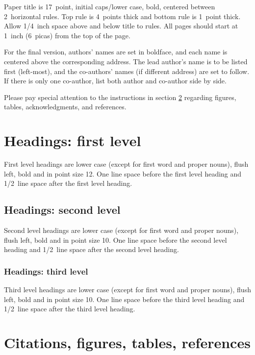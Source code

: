\documentclass{article} %
\begin{document}
Paper title is 17~point, initial caps/lower case, bold, centered between
2~horizontal rules. Top rule is 4~points thick and bottom rule is 1~point
thick. Allow 1/4~inch space above and below title to rules. All pages should
start at 1~inch (6~picas) from the top of the page.


For the final version, authors' names are
set in boldface, and each name is centered above the corresponding
address. The lead author's name is to be listed first (left-most), and
the co-authors' names (if different address) are set to follow. If
there is only one co-author, list both author and co-author side by side.

Please pay special attention to the instructions in section \ref{others}
regarding figures, tables, acknowledgments, and references.

\section{Headings: first level}
\label{headings}

First level headings are lower case (except for first word and proper nouns),
flush left, bold and in point size 12. One line space before the first level
heading and 1/2~line space after the first level heading.

\subsection{Headings: second level}

Second level headings are lower case (except for first word and proper nouns),
flush left, bold and in point size 10. One line space before the second level
heading and 1/2~line space after the second level heading.

\subsubsection{Headings: third level}

Third level headings are lower case (except for first word and proper nouns),
flush left, bold and in point size 10. One line space before the third level
heading and 1/2~line space after the third level heading.

\section{Citations, figures, tables, references}
\label{others}
\end{document}
